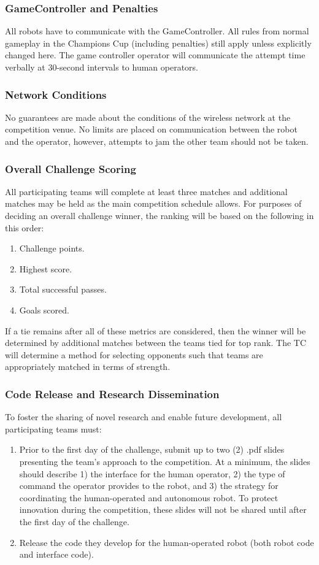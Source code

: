 \subsubsection{GameController and Penalties}
All robots have to communicate with the GameController. All rules from normal gameplay in the Champions Cup (including penalties) still apply unless explicitly changed here. The game controller operator will communicate the attempt time verbally at 30-second intervals to human operators.

\subsubsection{Network Conditions}
No guarantees are made about the conditions of the wireless network at the competition venue. No limits are placed on communication between the robot and the operator, however, attempts to jam the other team should not be taken. 

\subsubsection{Overall Challenge Scoring}
All participating teams will complete at least three matches and additional matches may be held as the main competition schedule allows. For purposes of deciding an overall challenge winner, the ranking will be based on the following in this order:

\begin{enumerate}
	\item Challenge points.
	\item Highest score.
	\item Total successful passes.
	\item Goals scored.
\end{enumerate}

If a tie remains after all of these metrics are considered, then the winner will be determined by additional matches between the teams tied for top rank. The TC will determine a method for selecting opponents such that teams are appropriately matched in terms of strength.

\subsubsection{Code Release and Research Dissemination}
To foster the sharing of novel research and enable future development, all participating teams must:
\begin{enumerate}
	\item Prior to the first day of the challenge, submit up to two (2) .pdf slides presenting the team's approach to the competition. At a minimum, the slides should describe 1) the interface for the human operator, 2) the type of command the operator provides to the robot, and 3) the strategy for coordinating the human-operated and autonomous robot. To protect innovation during the competition, these slides will not be shared until after the first day of the challenge.
	\item  Release the code they develop for the human-operated robot (both robot code and interface code).
\end{enumerate}

